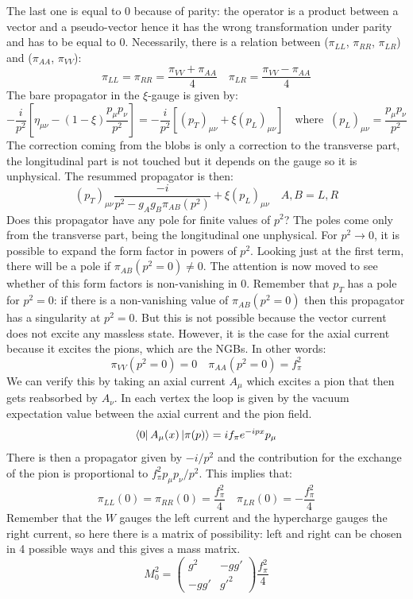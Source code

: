 \documentclass[../main.tex]{subfiles}
\begin{document}
The last one is equal to 0 because of parity: the operator is a product between a vector and a pseudo-vector hence it has the wrong transformation under parity and has to be equal to 0. Necessarily, there is a relation between ($\pi_{LL}$, $\pi_{RR}$, $\pi_{LR}$) and ($\pi_{AA}$, $\pi_{VV}$):
\[
\pi_{LL}=\pi_{RR}=\frac{\pi_{VV}+\pi_{AA}}{4} \quad \pi_{LR}=\frac{\pi_{VV}-\pi_{AA}}{4}
\]
The bare propagator in the $\xi$-gauge is given by:
\[
-\frac{i}{p^2}\left[\eta_{\mu\nu}-(1-\xi)\frac{p_\mu p_\nu}{p^2}\right]=-\frac{i}{p^2}\left[(p_T)_{\mu\nu}+\xi(p_L)_{\mu\nu}\right] \quad \text{where} \;\; (p_L)_{\mu\nu}=\frac{p_\mu p_\nu}{p^2}
\]
The correction coming from the blobs is only a correction to the transverse part, the longitudinal part is not touched but it depends on the gauge so it is unphysical. The resummed propagator is then:
\[
(p_T)_{\mu\nu}\frac{-i}{p^2-g_Ag_B\pi_{AB}(p^2)}+\xi(p_L)_{\mu\nu} \quad A,B=L,R
\]
Does this propagator have any pole for finite values of $p^2$? The poles come only from the transverse part, being the longitudinal one unphysical. For $p^2\to0$, it is possible to expand the form factor in powers of $p^2$. Looking just at the first term, there will be a pole if $\pi_{AB}(p^2=0)\neq0$. The attention is now moved to see whether of this form factors is non-vanishing in 0. Remember that $p_T$ has a pole for $p^2=0$: if there is a non-vanishing value of $\pi_{AB}(p^2=0)$ then this propagator has a singularity at $p^2=0$. But this is not possible because the vector current does not excite any massless state. However, it is the case for the axial current because it excites the pions, which are the NGBs. In other words:
\[
\pi_{VV}(p^2=0)=0 \quad \pi_{AA}(p^2=0)=f^2_\pi
\]
We can verify this by taking an axial current $A_\mu$ which excites a pion that then gets reabsorbed by $A_\nu$. In each vertex the loop is given by the vacuum expectation value between the axial current and the pion field. 
\[
\bra{0}A_\mu(x)\ket{\pi(p)}=if_\pi e^{-ipx}p_\mu
\]
There is then a propagator given by $-i/p^2$ and the contribution for the exchange of the pion is proportional to $f_\pi^2p_\mu p_\nu/p^2$. This implies that:
\[
\pi_{LL}(0)=\pi_{RR}(0)=\frac{f_\pi^2}{4} \quad \pi_{LR}(0)=-\frac{f_\pi^2}{4}
\]
Remember that the $W$ gauges the left current and the hypercharge gauges the right current, so here there is a matrix of possibility: left and right can be chosen in 4 possible ways and this gives a mass matrix.
\[
M_0^2=\left(\begin{array}{cc}
    g^2 & -gg' \\
    -gg' & g'^2
\end{array}\right)\frac{f_\pi^2}{4}
\]
\end{document}
